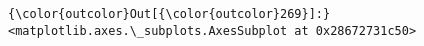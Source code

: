 \documentclass[11pt]{article}
\begin{document}
\begin{Verbatim}[commandchars=\\\{\}]
{\color{outcolor}Out[{\color{outcolor}269}]:} <matplotlib.axes.\_subplots.AxesSubplot at 0x28672731c50>
\end{Verbatim}
            
    \begin{center}
    \end{center}
    { \hspace*{\fill} \\}
    

    
    
    
    
\end{document}
